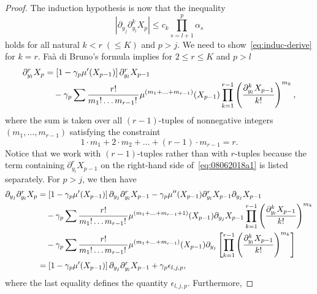 \documentclass[article]{elsarticle}
\begin{document}
\begin{proof}
The induction hypothesis is now that the inequality
\begin{equation}\label{eq:induc-derive}
\left|\partial_{y_{j}}\partial_{y_{l}}^{k}X_{p}\right|
\leq c_{k}\prod_{s=l+1}^{p}\alpha_{s}
\end{equation}
holds for all natural $k<r\;(\le K)$ and $p>j$.
We need to show~\eqref{eq:induc-derive} for $k=r$.
Fa\`a di Bruno's formula implies for $2\le r\le K$ and $p>l$
\begin{align}
\partial_{y_{l}}^{r}X_{p}
&=\left[1-\gamma_{p}\mu'(X_{p-1})\right]\partial_{y_{l}}^{r}X_{p-1}
\label{eq:08062018a1}\\
&\hspace{1em}-\gamma_{p}\sum\frac{r!}{m_{1}!\ldots m_{r-1}!\,}\mu^{(m_{1}+\ldots+m_{r-1})}(X_{p-1})\prod_{k=1}^{r-1}\left(\frac{\partial_{y_{l}}^{k}X_{p-1}}{k!}\right)^{m_{k}},
\notag
\end{align}
where the sum is taken over all $(r-1)$-tuples of nonnegative integers
$(m_{1},\ldots,m_{r-1})$ satisfying the constraint
\begin{equation}\label{eq:09062018a1}
1\cdot m_{1}+2\cdot m_{2}+\ldots+(r-1)\cdot m_{r-1}=r.
\end{equation}
Notice that we work with $(r-1)$-tuples
rather than with $r$-tuples
because the term containing
$\partial_{y_l}^r X_{p-1}$
on the right-hand side of~\eqref{eq:08062018a1}
is listed separately.
For $p>j$, we then have
\begin{align}
\partial_{y_{j}}\partial_{y_{l}}^{r}X_{p}
&=\left[1-\gamma_{p}\mu'(X_{p-1})\right]\partial_{y_{j}}\partial_{y_{l}}^{r}X_{p-1}-\gamma_{p}\mu''(X_{p-1})\partial_{y_{l}}^{r}X_{p-1}\partial_{y_{j}}X_{p-1}
\label{eq:09062018a2}\\
&\hspace{1em}-\gamma_{p}\sum\frac{r!}{m_{1}!\ldots m_{r-1}!\,}\mu^{(m_{1}+\ldots+m_{r-1}+1)}(X_{p-1})\partial_{y_{j}}X_{p-1}\prod_{k=1}^{r-1}\left(\frac{\partial_{y_{l}}^{k}X_{p-1}}{k!}\right)^{m_{k}}
\notag\\
&\hspace{1em}-\gamma_{p}\sum\frac{r!}{m_{1}!\ldots m_{r-1}!\,}\mu^{(m_{1}+\ldots+m_{r-1})}(X_{p-1})\partial_{y_{j}}\left[\prod_{k=1}^{r-1}\left(\frac{\partial_{y_{l}}^{k}X_{p-1}}{k!}\right)^{m_{k}}\right]
\notag\\
&=\left[1-\gamma_{p}\mu'(X_{p-1})\right]\partial_{y_{j}}\partial_{y_{l}}^{r}X_{p-1}+\gamma_{p}\epsilon_{l,j,p},
\notag
\end{align}
where the last equality defines the quantity $\epsilon_{l,j,p}$.
Furthermore,

\end{proof}
\end{document}
